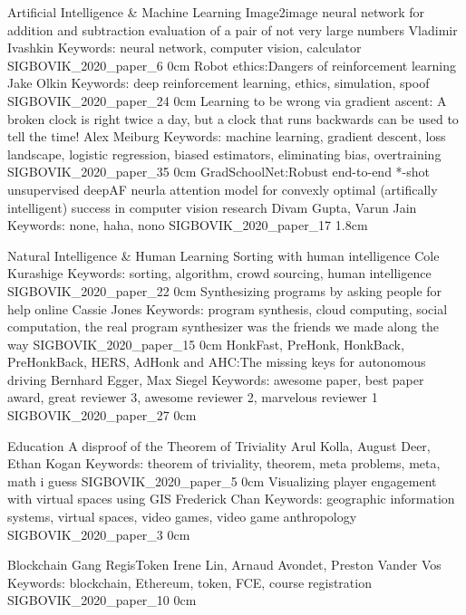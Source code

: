\addtrack
	{}{Artificial Intelligence \& Machine Learning}
\addpaper
	{Image2image neural network for addition and subtraction evaluation of a pair of not very large numbers}
	{Vladimir Ivashkin}
	{Keywords: neural network, computer vision, calculator}
	{SIGBOVIK_2020_paper_6}
	{0cm}
	{}
\addpaper
	{Robot ethics:\@ Dangers of reinforcement learning}
	{Jake Olkin}
	{Keywords: deep reinforcement learning, ethics, simulation, spoof}
	{SIGBOVIK_2020_paper_24}
	{0cm}
	{}
\addpaper
	{Learning to be wrong via gradient ascent: A broken clock is right twice a day, but a clock that runs backwards can be used to tell the time!}
	{Alex Meiburg}
	{Keywords: machine learning, gradient descent, loss landscape, logistic regression, biased estimators, eliminating bias, overtraining}
	{SIGBOVIK_2020_paper_35}
	{0cm}
	{}
\addpaper
	{GradSchoolNet:\@ Robust end-to-end *-shot unsupervised deepAF neurla attention model for convexly optimal (artifically intelligent) success in computer vision research}
	{Divam Gupta, Varun Jain}
	{Keywords: none, haha, nono}
	{SIGBOVIK_2020_paper_17}
	{1.8cm}
	{}

\addtrack
	{}{Natural Intelligence \& Human Learning}
\addpaper
	{Sorting with human intelligence}
	{Cole Kurashige}
	{Keywords: sorting, algorithm, crowd sourcing, human intelligence}
	{SIGBOVIK_2020_paper_22}
	{0cm}
	{}
\addpaper
	{Synthesizing programs by asking people for help online}
	{Cassie Jones}
	{Keywords: program synthesis, cloud computing, social computation, the real program synthesizer was the friends we made along the way}
	{SIGBOVIK_2020_paper_15}
	{0cm}
	{}
\addpaper
	{HonkFast, PreHonk, HonkBack, PreHonkBack, HERS, AdHonk and AHC:\@ The missing keys for autonomous driving}
	{Bernhard Egger, Max Siegel}
	{Keywords: awesome paper, best paper award, great reviewer 3, awesome reviewer 2, marvelous reviewer 1}
	{SIGBOVIK_2020_paper_27}
	{0cm}
	{}

\addtrack
	{}{Education}
\addpaper
	{A disproof of the Theorem of Triviality}
	{Arul Kolla, August Deer, Ethan Kogan}
	{Keywords: theorem of triviality, theorem, meta problems, meta, math i guess}
	{SIGBOVIK_2020_paper_5}
	{0cm}
	{}
\addpaper
	{Visualizing player engagement with virtual spaces using GIS}
	{Frederick Chan}
	{Keywords: geographic information systems, virtual spaces, video games, video game anthropology}
	{SIGBOVIK_2020_paper_3}
	{0cm}
	{}

\addtrack
	{}{Blockchain Gang}
\addpaper
	{RegisToken}
	{Irene Lin, Arnaud Avondet, Preston Vander Vos}
	{Keywords: blockchain, Ethereum, token, FCE, course registration}
	{SIGBOVIK_2020_paper_10}
	{0cm}
	{}

